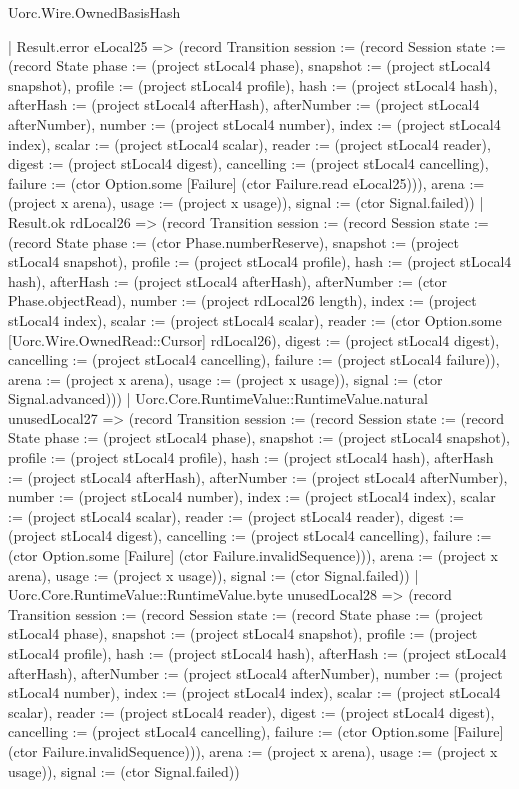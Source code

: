 \begin{lexlean}{Uorc.Wire.OwnedBasisHash}
\begin{semanticmodule}
{            | Result.error eLocal25 => (record Transition {session := (record Session {state := (record State {phase := (project stLocal4 phase), snapshot := (project stLocal4 snapshot), profile := (project stLocal4 profile), hash := (project stLocal4 hash), afterHash := (project stLocal4 afterHash), afterNumber := (project stLocal4 afterNumber), number := (project stLocal4 number), index := (project stLocal4 index), scalar := (project stLocal4 scalar), reader := (project stLocal4 reader), digest := (project stLocal4 digest), cancelling := (project stLocal4 cancelling), failure := (ctor Option.some [Failure] (ctor Failure.read eLocal25))}), arena := (project x arena), usage := (project x usage)}), signal := (ctor Signal.failed)})
            | Result.ok rdLocal26 => (record Transition {session := (record Session {state := (record State {phase := (ctor Phase.numberReserve), snapshot := (project stLocal4 snapshot), profile := (project stLocal4 profile), hash := (project stLocal4 hash), afterHash := (project stLocal4 afterHash), afterNumber := (ctor Phase.objectRead), number := (project rdLocal26 length), index := (project stLocal4 index), scalar := (project stLocal4 scalar), reader := (ctor Option.some [Uorc.Wire.OwnedRead::Cursor] rdLocal26), digest := (project stLocal4 digest), cancelling := (project stLocal4 cancelling), failure := (project stLocal4 failure)}), arena := (project x arena), usage := (project x usage)}), signal := (ctor Signal.advanced)}))
          | Uorc.Core.RuntimeValue::RuntimeValue.natural unusedLocal27 => (record Transition {session := (record Session {state := (record State {phase := (project stLocal4 phase), snapshot := (project stLocal4 snapshot), profile := (project stLocal4 profile), hash := (project stLocal4 hash), afterHash := (project stLocal4 afterHash), afterNumber := (project stLocal4 afterNumber), number := (project stLocal4 number), index := (project stLocal4 index), scalar := (project stLocal4 scalar), reader := (project stLocal4 reader), digest := (project stLocal4 digest), cancelling := (project stLocal4 cancelling), failure := (ctor Option.some [Failure] (ctor Failure.invalidSequence))}), arena := (project x arena), usage := (project x usage)}), signal := (ctor Signal.failed)})
          | Uorc.Core.RuntimeValue::RuntimeValue.byte unusedLocal28 => (record Transition {session := (record Session {state := (record State {phase := (project stLocal4 phase), snapshot := (project stLocal4 snapshot), profile := (project stLocal4 profile), hash := (project stLocal4 hash), afterHash := (project stLocal4 afterHash), afterNumber := (project stLocal4 afterNumber), number := (project stLocal4 number), index := (project stLocal4 index), scalar := (project stLocal4 scalar), reader := (project stLocal4 reader), digest := (project stLocal4 digest), cancelling := (project stLocal4 cancelling), failure := (ctor Option.some [Failure] (ctor Failure.invalidSequence))}), arena := (project x arena), usage := (project x usage)}), signal := (ctor Signal.failed)})
}
\end{semanticmodule}
\end{lexlean}
